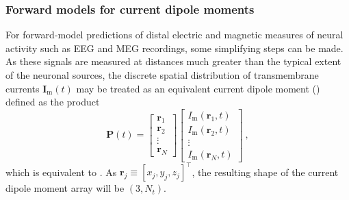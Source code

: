\subsubsection{Forward models for current dipole moments}
For forward-model predictions of distal electric and magnetic measures of neural activity such as EEG and MEG recordings,
some simplifying steps can be made.
As these signals are measured at distances much greater than the typical extent of the neuronal sources,
the discrete spatial distribution of transmembrane currents $\mathbf{I}_\mathrm{m}(t)$ may be
treated as an equivalent current dipole moment () defined as the product
\begin{equation}
\mathbf{P}(t) =
\begin{bmatrix}
\mathbf{r}_1 \\
\mathbf{r}_2 \\
\vdots \\
\mathbf{r}_N
\end{bmatrix}
\begin{bmatrix}
I_\mathrm{m}(\mathbf{r}_1, t) \\
I_\mathrm{m}(\mathbf{r}_2, t) \\
\vdots \\
I_\mathrm{m}(\mathbf{r}_N, t)
\end{bmatrix} ~,
\end{equation}
which is equivalent to .
As $\mathbf{r}_j \equiv [x_j, y_j, z_j]^\top$, 
the resulting shape of the current dipole moment array will be $(3, N_t)$.

